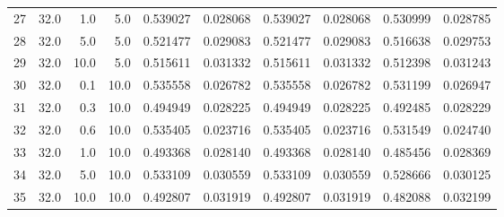 \begin{tabular}{lrrrrrrrrr}
27 &            32.0 &   1.0 &   5.0 &         0.539027 &        0.028068 &         0.539027 &        0.028068 &         0.530999 &        0.028785 \\
28 &            32.0 &   5.0 &   5.0 &         0.521477 &        0.029083 &         0.521477 &        0.029083 &         0.516638 &        0.029753 \\
29 &            32.0 &  10.0 &   5.0 &         0.515611 &        0.031332 &         0.515611 &        0.031332 &         0.512398 &        0.031243 \\
30 &            32.0 &   0.1 &  10.0 &         0.535558 &        0.026782 &         0.535558 &        0.026782 &         0.531199 &        0.026947 \\
31 &            32.0 &   0.3 &  10.0 &         0.494949 &        0.028225 &         0.494949 &        0.028225 &         0.492485 &        0.028229 \\
32 &            32.0 &   0.6 &  10.0 &         0.535405 &        0.023716 &         0.535405 &        0.023716 &         0.531549 &        0.024740 \\
33 &            32.0 &   1.0 &  10.0 &         0.493368 &        0.028140 &         0.493368 &        0.028140 &         0.485456 &        0.028369 \\
34 &            32.0 &   5.0 &  10.0 &         0.533109 &        0.030559 &         0.533109 &        0.030559 &         0.528666 &        0.030125 \\
35 &            32.0 &  10.0 &  10.0 &         0.492807 &        0.031919 &         0.492807 &        0.031919 &         0.482088 &        0.032199 \\
\bottomrule
\end{tabular}

